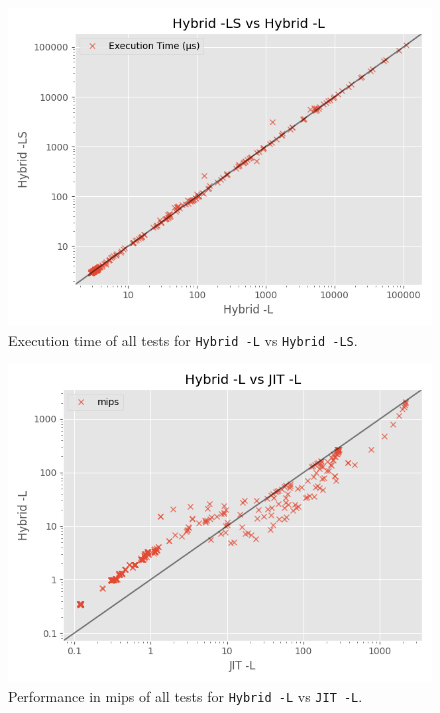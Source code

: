 
\begin{figure}[H]
    \centering
    \includegraphics[scale=0.75]{output/graphs/scatter/vs/Hybrid -L-vs-Hybrid -LS-time.png}
    \caption{Execution time of all tests for \texttt{Hybrid -L} vs \texttt{Hybrid -LS}.}
    \label{figure:hybrid-l-vs-hybrid-ls}
\end{figure}


\begin{figure}[H]
    \centering
    \includegraphics[scale=0.75]{output/graphs/scatter/vs/JIT -L-vs-Hybrid -L-mips.png}
    \caption{Performance in mips of all tests for \texttt{Hybrid -L} vs \texttt{JIT -L}.}
    \label{figure:hybrid-l-vs-jit-l-mips}
\end{figure}

